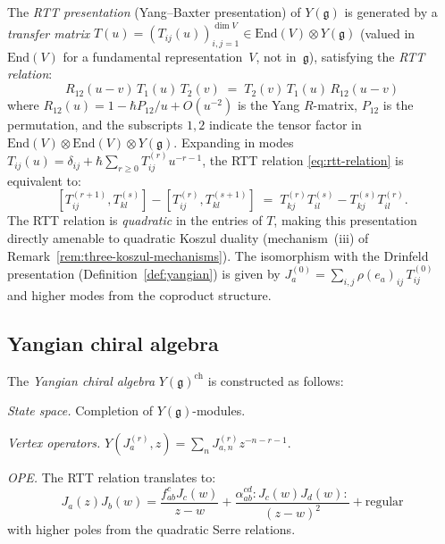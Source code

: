 \begin{definition}\label{def:yangian-rtt}
The \emph{RTT presentation} (Yang--Baxter presentation) of
$Y(\mathfrak{g})$ is generated by a \emph{transfer matrix}
$T(u) = (T_{ij}(u))_{i,j=1}^{\dim V}
\in \mathrm{End}(V) \otimes Y(\mathfrak{g})$
(valued in $\mathrm{End}(V)$ for a fundamental representation~$V$,
not in~$\mathfrak{g}$), satisfying the \emph{RTT relation}:
\begin{equation}\label{eq:rtt-relation}
R_{12}(u-v)\, T_1(u)\, T_2(v)
\;=\; T_2(v)\, T_1(u)\, R_{12}(u-v)
\end{equation}
where $R_{12}(u) = 1 - \hbar P_{12}/u + O(u^{-2})$ is the
Yang $R$-matrix, $P_{12}$ is the permutation, and the subscripts
$1, 2$ indicate the tensor factor in
$\mathrm{End}(V) \otimes \mathrm{End}(V) \otimes Y(\mathfrak{g})$.
Expanding in modes
$T_{ij}(u) = \delta_{ij} + \hbar \sum_{r \geq 0} T_{ij}^{(r)} u^{-r-1}$,
the RTT relation \eqref{eq:rtt-relation} is equivalent to:
\begin{equation}\label{eq:rtt-modes}
[T_{ij}^{(r+1)}, T_{kl}^{(s)}]
- [T_{ij}^{(r)}, T_{kl}^{(s+1)}]
\;=\; T_{kj}^{(r)} T_{il}^{(s)}
- T_{kj}^{(s)} T_{il}^{(r)}.
\end{equation}
The RTT relation is \emph{quadratic} in the entries of $T$, making
this presentation directly amenable to quadratic Koszul duality
(mechanism~(iii) of Remark~\ref{rem:three-koszul-mechanisms}).
The isomorphism with the Drinfeld presentation
(Definition~\ref{def:yangian}) is given by
$J_a^{(0)} = \sum_{i,j} \rho(e_a)_{ij}\, T_{ij}^{(0)}$
and higher modes from the coproduct structure.
\end{definition}


\subsection{Yangian chiral algebra}

\begin{construction}\label{constr:yangian-va}
The \emph{Yangian chiral algebra} $Y(\mathfrak{g})^{\mathrm{ch}}$ is constructed as follows:

\emph{State space.} Completion of $Y(\mathfrak{g})$-modules.

\emph{Vertex operators.} $Y(J^{(r)}_a, z) = \sum_n J^{(r)}_{a,n} z^{-n-r-1}$.

\emph{OPE.} The RTT relation translates to:
\[
J_a(z) J_b(w) = \frac{f_{ab}^c J_c(w)}{z - w} + \frac{\alpha_{ab}^{cd} {:}J_c(w) J_d(w){:}}{(z-w)^2} + \text{regular}
\]
with higher poles from the quadratic Serre relations.
\end{construction}

